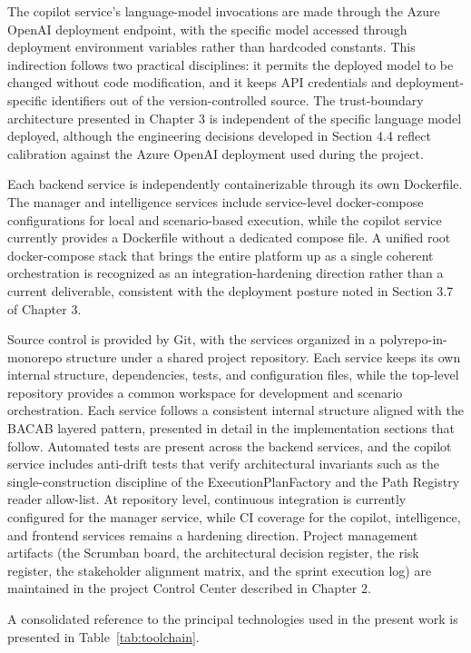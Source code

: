 The copilot service's language-model invocations are made through the Azure OpenAI deployment endpoint, with the specific model accessed through deployment environment variables rather than hardcoded constants. This indirection follows two practical disciplines: it permits the deployed model to be changed without code modification, and it keeps API credentials and deployment-specific identifiers out of the version-controlled source. The trust-boundary architecture presented in Chapter 3 is independent of the specific language model deployed, although the engineering decisions developed in Section 4.4 reflect calibration against the Azure OpenAI deployment used during the project.

Each backend service is independently containerizable through its own Dockerfile. The manager and intelligence services include service-level docker-compose configurations for local and scenario-based execution, while the copilot service currently provides a Dockerfile without a dedicated compose file. A unified root docker-compose stack that brings the entire platform up as a single coherent orchestration is recognized as an integration-hardening direction rather than a current deliverable, consistent with the deployment posture noted in Section 3.7 of Chapter 3.

Source control is provided by Git, with the services organized in a polyrepo-in-monorepo structure under a shared project repository. Each service keeps its own internal structure, dependencies, tests, and configuration files, while the top-level repository provides a common workspace for development and scenario orchestration. Each service follows a consistent internal structure aligned with the BACAB layered pattern, presented in detail in the implementation sections that follow. Automated tests are present across the backend services, and the copilot service includes anti-drift tests that verify architectural invariants such as the single-construction discipline of the ExecutionPlanFactory and the Path Registry reader allow-list. At repository level, continuous integration is currently configured for the manager service, while CI coverage for the copilot, intelligence, and frontend services remains a hardening direction. Project management artifacts (the Scrumban board, the architectural decision register, the risk register, the stakeholder alignment matrix, and the sprint execution log) are maintained in the project Control Center described in Chapter 2.

A consolidated reference to the principal technologies used in the present work is presented in Table~\ref{tab:toolchain}.

